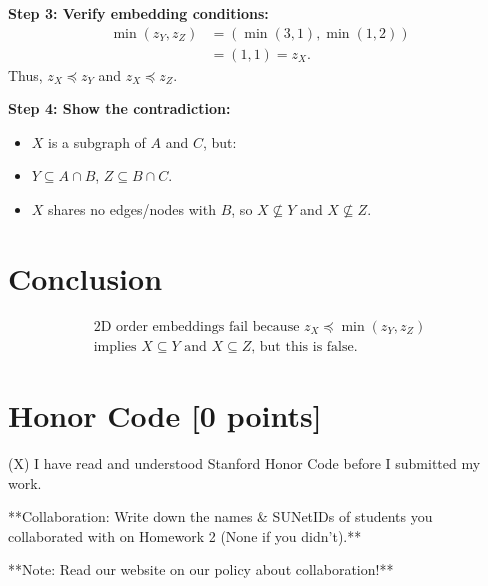 \documentclass[11pt]{article}
\numberwithin{figure}{section}
\begin{document}
\textbf{Step 3: Verify embedding conditions:}
\begin{align*}
    \min(z_Y, z_Z) &= (\min(3, 1), \min(1, 2)) \\
    &= (1, 1) = z_X.
\end{align*}
Thus, $ z_X \preccurlyeq z_Y $ and $ z_X \preccurlyeq z_Z $.

\textbf{Step 4: Show the contradiction:}
\begin{itemize}
    \item $ X $ is a subgraph of $ A $ and $ C $, but:
    \item $ Y \subseteq A \cap B $, $ Z \subseteq B \cap C $.
    \item $ X $ shares no edges/nodes with $ B $, so $ X \not\subseteq Y $ and $ X \not\subseteq Z $.
\end{itemize}

\section*{Conclusion}
$$
\boxed{
\begin{array}{l}
\text{2D order embeddings fail because } z_X \preccurlyeq \min(z_Y, z_Z) \\
\text{implies } X \subseteq Y \text{ and } X \subseteq Z \text{, but this is false.}
\end{array}
}
$$


\newpage

\section{Honor Code [0 points]}
(X) I have read and understood Stanford Honor Code before I submitted my
work.

**Collaboration: Write down the names \& SUNetIDs of students you collaborated with on Homework 2 (None if you didn’t).**

**Note: Read our website on our policy about collaboration!**
\end{document}
